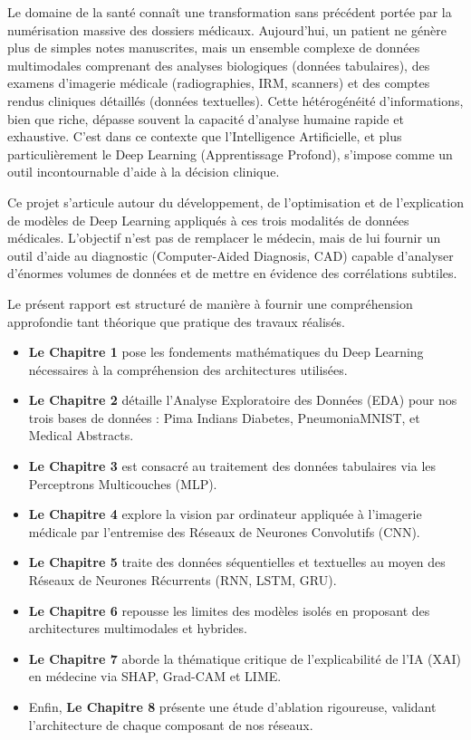 \documentclass[a4paper,12pt]{report}
\begin{document}
Le domaine de la santé connaît une transformation sans précédent portée par la numérisation massive des dossiers médicaux. Aujourd'hui, un patient ne génère plus de simples notes manuscrites, mais un ensemble complexe de données multimodales comprenant des analyses biologiques (données tabulaires), des examens d'imagerie médicale (radiographies, IRM, scanners) et des comptes rendus cliniques détaillés (données textuelles). Cette hétérogénéité d'informations, bien que riche, dépasse souvent la capacité d'analyse humaine rapide et exhaustive. C'est dans ce contexte que l'Intelligence Artificielle, et plus particulièrement le Deep Learning (Apprentissage Profond), s'impose comme un outil incontournable d'aide à la décision clinique.

Ce projet s'articule autour du développement, de l'optimisation et de l'explication de modèles de Deep Learning appliqués à ces trois modalités de données médicales. L'objectif n'est pas de remplacer le médecin, mais de lui fournir un outil d'aide au diagnostic (Computer-Aided Diagnosis, CAD) capable d'analyser d'énormes volumes de données et de mettre en évidence des corrélations subtiles. 

Le présent rapport est structuré de manière à fournir une compréhension approfondie tant théorique que pratique des travaux réalisés. 
\begin{itemize}
    \item \textbf{Le Chapitre 1} pose les fondements mathématiques du Deep Learning nécessaires à la compréhension des architectures utilisées.
    \item \textbf{Le Chapitre 2} détaille l'Analyse Exploratoire des Données (EDA) pour nos trois bases de données : Pima Indians Diabetes, PneumoniaMNIST, et Medical Abstracts.
    \item \textbf{Le Chapitre 3} est consacré au traitement des données tabulaires via les Perceptrons Multicouches (MLP).
    \item \textbf{Le Chapitre 4} explore la vision par ordinateur appliquée à l'imagerie médicale par l'entremise des Réseaux de Neurones Convolutifs (CNN).
    \item \textbf{Le Chapitre 5} traite des données séquentielles et textuelles au moyen des Réseaux de Neurones Récurrents (RNN, LSTM, GRU).
    \item \textbf{Le Chapitre 6} repousse les limites des modèles isolés en proposant des architectures multimodales et hybrides.
    \item \textbf{Le Chapitre 7} aborde la thématique critique de l'explicabilité de l'IA (XAI) en médecine via SHAP, Grad-CAM et LIME.
    \item Enfin, \textbf{Le Chapitre 8} présente une étude d'ablation rigoureuse, validant l'architecture de chaque composant de nos réseaux.
\end{itemize}
\end{document}
